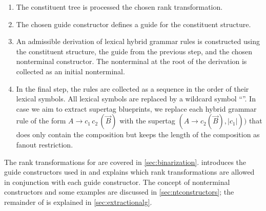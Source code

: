 \documentclass[../../document.tex]{subfiles}
\begin{document}
    \begin{enumerate}
        \item\label{extraction:hg:ranktrans}
            The constituent tree is processed the chosen rank transformation.
        \item\label{extraction:hg:guide}
            The chosen guide constructor defines a guide for the constituent structure.
        \item\label{extraction:hg:alg}
            An admissible derivation of lexical hybrid grammar rules is constructed using the constituent structure, the guide from the previous step, and the chosen nonterminal constructor.
            The  nonterminal at the root of the derivation is collected as an initial nonterminal.
        \item
            In the final step, the rules are collected as a sequence in the order of their lexical symbols.
            All lexical symbols are replaced by a wildcard symbol ``\wildcard{}''.
            In case we aim to extract  supertag blueprints, we replace each hybrid grammar rule of the form \(A \to c_1\,c_2\,(\vec{B})\) with the  supertag \((A \to c_2 (\vec{B}), |c_1|))\) that does only contain the  composition but keeps the length of the  composition as fanout restriction.
    \end{enumerate}
    The rank transformations for  are covered in \cref{sec:binarization}.
     introduces the guide constructors used in  and explains which rank transformations are allowed in conjunction with each guide constructor.
    The concept of nonterminal constructors and some examples are discussed in \cref{sec:ntconstructors}; the remainder of  is explained in \cref{sec:extractionalg}.
    

    
    
    

    \ifSubfilesClassLoaded{%
        \printindex
    }{}
\end{document}
